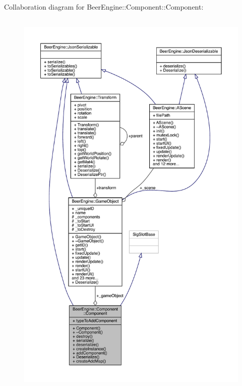 Collaboration diagram for Beer\+Engine\+:\+:Component\+:\+:Component\+:\nopagebreak
\begin{figure}[H]
\begin{center}
\leavevmode
\includegraphics[height=550pt]{class_beer_engine_1_1_component_1_1_component__coll__graph}
\end{center}
\end{figure}
